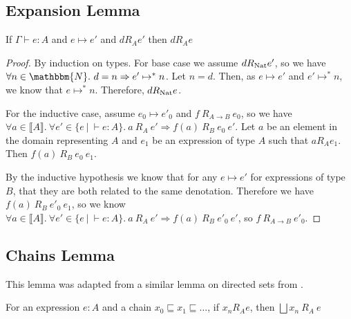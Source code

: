 \subsection{Expansion Lemma}\label{exp}

\vspace{0.25cm}

\begin{lem}\label{exp}
If $\Gamma \vdash e : A$ and $e \mapsto e'$ and $d R_A e'$ then $d R_A e$ 
\end{lem}

\begin{proof}
By induction on types. For base case we assume $d R_{\operatorname{Nat}} e'$, so we have $\forall n \in \mathbbm{N}. \ d = n \Rightarrow e' \mapsto^* n$. Let $n = d$. Then, as $e \mapsto e'$ and $e' \mapsto^* n$, we know that $e \mapsto^*n$. Therefore, $d R_{\operatorname{Nat}} e$.

For the inductive case, assume $e_0 \mapsto e'_0$ and $f \ R_{A \to B} \ e_0$, so we have $\forall a \in \llbracket A \rrbracket. \ \forall e' \in \{ e \ | \ \vdash e : A\}. \ a \ R_A \ e' \Rightarrow f(a) \ R_B \ e_0 \ e'$. Let $a$ be an element in the domain representing $A$ and $e_1$ be an expression of type $A$ such that $a R_A e_1$. Then $f(a) \ R_B \ e_0 \ e_1$.

By the inductive hypothesis we know that for any $e \mapsto e'$ for expressions of type $B$, that they are both related to the same denotation. Therefore we have $f(a) \ R_B \ e'_0 \ e_1$, so we know $\forall a \in \llbracket A \rrbracket. \ \forall e' \in \{ e \ | \ \vdash e : A\}. \ a \ R_A \ e' \Rightarrow f(a) \ R_B \ e'_0 \ e'$, so $f \ R_{A \to B} \ e'_0$. 
\end{proof}

\subsection{Chains Lemma}

This lemma was adapted from a similar lemma on directed sets from \citep{Streicher06}.

\vspace{0.25cm}

\begin{lem}\label{chain}
For an expression $e : A$ and a  chain $x_0 \sqsubseteq x_1 \sqsubseteq \dots$, if $x_n R_A e$, then $\bigsqcup x_n \ R_A \ e$
\end{lem}

